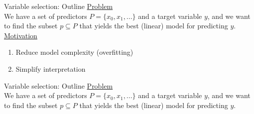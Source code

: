\documentclass[8pt]{beamer}
\begin{document}
    \begin{frame}[t]{Variable selection: Outline} %
        \underline{Problem}\\
        We have a set of predictors $P=\{x_0, x_1, ...\}$ and a target variable $y$, and we want to find the subset $p \subseteq P$ that yields the best (linear) model for predicting $y$.\\
        \vspace{0.25cm}
        \underline{Motivation}\\
        \begin{enumerate}
            \item Reduce model complexity (overfitting)
            \item Simplify interpretation
        \end{enumerate}
    \end{frame}

    \def\codewidth{10cm}

    \begin{frame}[t]{Variable selection: Outline} %
        \underline{Problem}\\
        We have a set of predictors $P=\{x_0, x_1, ...\}$ and a target variable $y$, and we want to find the subset $p \subseteq P$ that yields the best (linear) model for predicting $y$.\\
        \vspace{0.25cm}

        \centering
    \end{frame}
\end{document}
